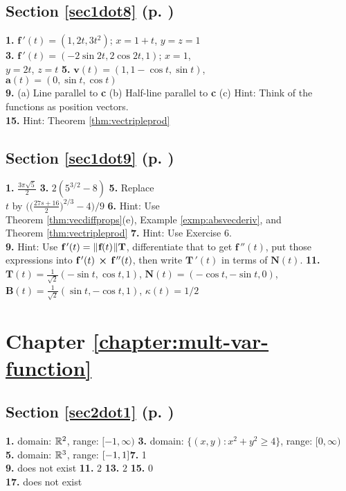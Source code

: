 \begin{multicols}{2}
\subsection*{Section \ref{sec1dot8} (p. \pageref{sec1dot8})}
\textbf{1.} $\textbf{f}\,'(t) = (1,2t,3t^2)$; $x = 1 + t$, $y = z = 1$\\\textbf{3.} $\textbf{f}\,'(t) =
(-2\sin 2t,2\cos 2t,1)$; $x = 1$,\\$y = 2t$, $z = t$ \quad \textbf{5.} $\textbf{v}(t) = (1,1 - \cos t,\sin t)$,\\
$\textbf{a}(t) = (0,\sin t,\cos t)$\\\textbf{9.} (a) Line parallel to \textbf{c} \quad (b) Half-line parallel to
\textbf{c} \quad (c) Hint:  Think of the\\functions as position vectors.\\\textbf{15.} Hint: Theorem
\ref{thm:vectripleprod}
\subsection*{Section \ref{sec1dot9} (p. \pageref{sec1dot9})}
\textbf{1.} $\frac{3\pi \sqrt{5}}{2}$ \quad \textbf{3.} $2 (5^{3/2} - 8)$ \quad \textbf{5.} Replace\\$t$ by
$\biggl( \biggl( \frac{27s + 16}{2} \biggr)^{2/3} - 4 \biggr)\bigg/ 9$ \quad \textbf{6.} Hint: Use\\Theorem
\ref{thm:vecdiffprops}(e), Example \ref{exmp:absvecderiv}, and\\Theorem \ref{thm:vectripleprod} \quad \textbf{7.} Hint:
Use Exercise 6.\\\textbf{9.} Hint: Use $\textbf{f}\,'(t) = \lVert\mspace{1mu}\textbf{f}(t)\mspace{1mu}\rVert\textbf{T}$, differentiate that
to get $\textbf{f}\,''(t)$, put those expressions into $\textbf{f}\,'(t)\, \bm{\times} \,\textbf{f}\,''(t)$, then
write $\textbf{T}\,'(t)$ in terms of $\textbf{N}(t)$. \quad \textbf{11.} $\textbf{T}(t) = \frac{1}{\sqrt{2}}
(-\sin t,\cos t,1)$, $\textbf{N}(t) = (-\cos t,-\sin t,0)$, $\textbf{B}(t) = \frac{1}{\sqrt{2}}(\sin t,-\cos t,1)$,
$\kappa(t) = 1/2$
\section*{Chapter \ref{chapter:mult-var-function}}
\subsection*{Section \ref{sec2dot1} (p. \pageref{sec2dot1})}
\textbf{1.} domain: $\mathbb{R}^{2}$, range: $\lbrack -1,\infty )$\quad
\textbf{3.} domain: $\lbrace (x,y): x^2 + y^2 \ge 4 \rbrace$, range: $\lbrack 0,\infty)$\\\textbf{5.} domain:
$\mathbb{R}^{3}$, range: $\lbrack -1,1 \rbrack$\quad\textbf{7.} 1\\\textbf{9.} does not exist\quad
\textbf{11.} $2$\quad
\textbf{13.} $2$\quad
\textbf{15.} $0$\\\textbf{17.} does not exist

\end{multicols}
